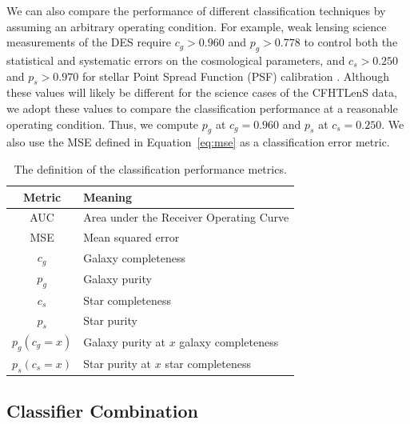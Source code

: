 \documentclass[useAMS,usenatbib]{mn2e}
\begin{document}
We can also compare the performance of different classification techniques
by assuming an arbitrary operating condition.
For example, weak lensing science measurements
of the DES require $c_g > 0.960$ and $p_g > 0.778$
to control both the statistical and systematic errors
on the cosmological parameters,
and $c_s > 0.250$ and $p_s > 0.970$
for stellar Point Spread Function (PSF) calibration
\citep{soumagnac2013star}.
Although these values will likely be different
for the science cases of the CFHTLenS data,
we adopt these values to compare the classification performance
at a reasonable operating condition.
Thus, we compute $p_{g}$ at $c_g=0.960$
and $p_{s}$ at $c_s=0.250$.
We also use the MSE defined in Equation~\ref{eq:mse}
as a classification error metric.

\begin{table}
  \caption{The definition of the classification performance metrics.}
  \centering
  \begin{tabular}{c l}
  Metric & Meaning \\
  \hline
  AUC & Area under the Receiver Operating Curve \\
  MSE & Mean squared error \\
  $c_g$ & Galaxy completeness \\
  $p_g$ & Galaxy purity \\
  $c_s$ & Star completeness \\
  $p_s$ & Star purity \\
  $p_g(c_g=x)$ & Galaxy purity at $x$ galaxy completeness \\
  $p_s(c_s=x)$ & Star purity at $x$ star completeness \\
  \end{tabular}
  \label{table:metrics}
\end{table}


\subsection{Classifier Combination}
  \label{section:rich_training}

\begin{table}
  \caption{A summary of the classification performance metrics
           for the four individual methods
           and the four different classification combination methods
           as applied to the CFHTLenS data,
           with no cut applied to the training data set.
           The definition of the metrics is summarized in
           Table~\ref{table:metrics}.
           The bold entries highlight the best performance values
           within each column.}
  \centering
  
  \label{table:metrics_all}
\end{table}
\end{document}
